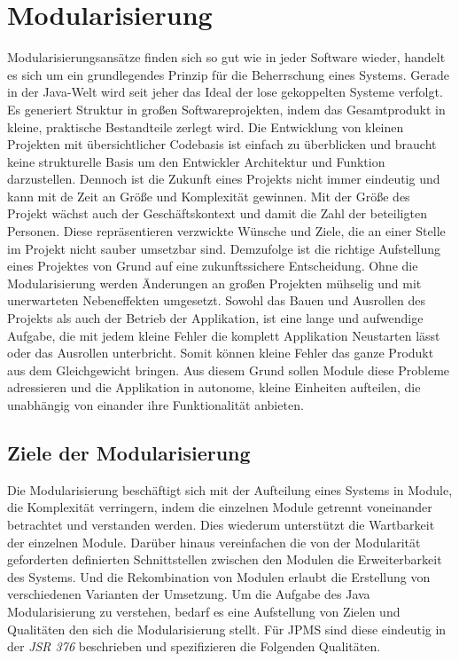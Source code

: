 \section{Modularisierung} \label{sec:modularisierung}
  Modularisierungsansätze finden sich so gut wie in jeder Software wieder, handelt es sich um ein grundlegendes Prinzip für die Beherrschung eines Systems. 
  Gerade in der Java-Welt wird seit jeher das Ideal der lose gekoppelten Systeme verfolgt. 
  \newline Es generiert  Struktur in großen Softwareprojekten, indem das Gesamtprodukt in kleine, praktische Bestandteile zerlegt wird. 
  Die Entwicklung von kleinen Projekten mit übersichtlicher Codebasis ist einfach zu überblicken und braucht keine strukturelle Basis um den Entwickler Architektur und Funktion darzustellen. 
  Dennoch ist die Zukunft eines Projekts nicht immer eindeutig und kann mit de Zeit an Größe und Komplexität gewinnen. 
  Mit der Größe des Projekt wächst auch der Geschäftskontext und damit die Zahl der beteiligten Personen. Diese repräsentieren verzwickte Wünsche und Ziele, die an einer Stelle im Projekt nicht sauber umsetzbar sind.
  Demzufolge ist die richtige Aufstellung eines Projektes von Grund auf eine zukunftssichere Entscheidung. 
  \newline Ohne die Modularisierung werden Änderungen an großen Projekten mühselig und mit unerwarteten Nebeneffekten umgesetzt. 
  Sowohl das Bauen und Ausrollen des Projekts als auch der Betrieb der Applikation, ist eine lange und aufwendige Aufgabe, die mit jedem kleine Fehler die komplett Applikation Neustarten lässt oder das Ausrollen unterbricht. 
  Somit können kleine Fehler das ganze Produkt aus dem Gleichgewicht bringen.
  Aus diesem Grund sollen Module diese Probleme adressieren und die Applikation in autonome, kleine Einheiten aufteilen, die unabhängig von einander ihre Funktionalität anbieten.

  \subsection{Ziele der Modularisierung}
    Die Modularisierung beschäftigt sich mit der Aufteilung eines Systems in Module, die Komplexität verringern, indem die einzelnen Module getrennt voneinander betrachtet und verstanden werden. 
    Dies wiederum unterstützt die Wartbarkeit der einzelnen Module. 
    Darüber hinaus vereinfachen die von der Modularität geforderten definierten Schnittstellen zwischen den Modulen die Erweiterbarkeit des Systems. 
    Und die Rekombination von Modulen erlaubt die Erstellung von verschiedenen Varianten der Umsetzung. 
    \newline Um die Aufgabe des Java Modularisierung zu verstehen, bedarf es eine Aufstellung von Zielen und Qualitäten den sich die Modularisierung stellt. 
    Für JPMS sind diese eindeutig in der \textit{JSR 376} beschrieben und spezifizieren die Folgenden Qualitäten.

